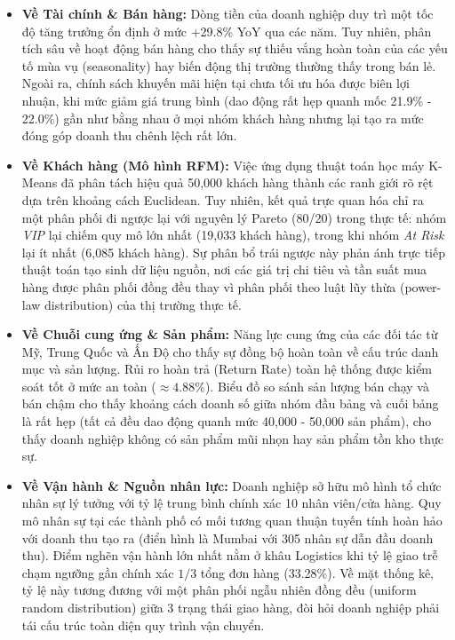 \begin{itemize}
    \item \textbf{Về Tài chính \& Bán hàng:} Dòng tiền của doanh nghiệp duy trì một tốc độ tăng trưởng ổn định ở mức +29.8\% YoY qua các năm. Tuy nhiên, phân tích sâu về hoạt động bán hàng cho thấy sự thiếu vắng hoàn toàn của các yếu tố mùa vụ (seasonality) hay biến động thị trường thường thấy trong bán lẻ. Ngoài ra, chính sách khuyến mãi hiện tại chưa tối ưu hóa được biên lợi nhuận, khi mức giảm giá trung bình (dao động rất hẹp quanh mốc 21.9\% - 22.0\%) gần như bằng nhau ở mọi nhóm khách hàng nhưng lại tạo ra mức đóng góp doanh thu chênh lệch rất lớn.
    
    \item \textbf{Về Khách hàng (Mô hình RFM):} Việc ứng dụng thuật toán học máy K-Means \cite{macqueen1967} đã phân tách hiệu quả 50,000 khách hàng thành các ranh giới rõ rệt dựa trên khoảng cách Euclidean. Tuy nhiên, kết quả trực quan hóa chỉ ra một phân phối đi ngược lại với nguyên lý Pareto (80/20) trong thực tế: nhóm \textit{VIP} lại chiếm quy mô lớn nhất (19,033 khách hàng), trong khi nhóm \textit{At Risk} lại ít nhất (6,085 khách hàng). Sự phân bổ trái ngược này phản ánh trực tiếp thuật toán tạo sinh dữ liệu nguồn, nơi các giá trị chi tiêu và tần suất mua hàng được phân phối đồng đều thay vì phân phối theo luật lũy thừa (power-law distribution) của thị trường thực tế.
    
    \item \textbf{Về Chuỗi cung ứng \& Sản phẩm:} Năng lực cung ứng của các đối tác từ Mỹ, Trung Quốc và Ấn Độ cho thấy sự đồng bộ hoàn toàn về cấu trúc danh mục và sản lượng. Rủi ro hoàn trả (Return Rate) toàn hệ thống được kiểm soát tốt ở mức an toàn ($\approx 4.88\%$). Biểu đồ so sánh sản lượng bán chạy và bán chậm cho thấy khoảng cách doanh số giữa nhóm đầu bảng và cuối bảng là rất hẹp (tất cả đều dao động quanh mức 40,000 - 50,000 sản phẩm), cho thấy doanh nghiệp không có sản phẩm mũi nhọn hay sản phẩm tồn kho thực sự.
    
    \item \textbf{Về Vận hành \& Nguồn nhân lực:} Doanh nghiệp sở hữu mô hình tổ chức nhân sự lý tưởng với tỷ lệ trung bình chính xác 10 nhân viên/cửa hàng. Quy mô nhân sự tại các thành phố có mối tương quan thuận tuyến tính hoàn hảo với doanh thu tạo ra (điển hình là Mumbai với 305 nhân sự dẫn đầu doanh thu). Điểm nghẽn vận hành lớn nhất nằm ở khâu Logistics khi tỷ lệ giao trễ chạm ngưỡng gần chính xác $1/3$ tổng đơn hàng (33.28\%). Về mặt thống kê, tỷ lệ này tương đương với một phân phối ngẫu nhiên đồng đều (uniform random distribution) giữa 3 trạng thái giao hàng, đòi hỏi doanh nghiệp phải tái cấu trúc toàn diện quy trình vận chuyển.
\end{itemize}

